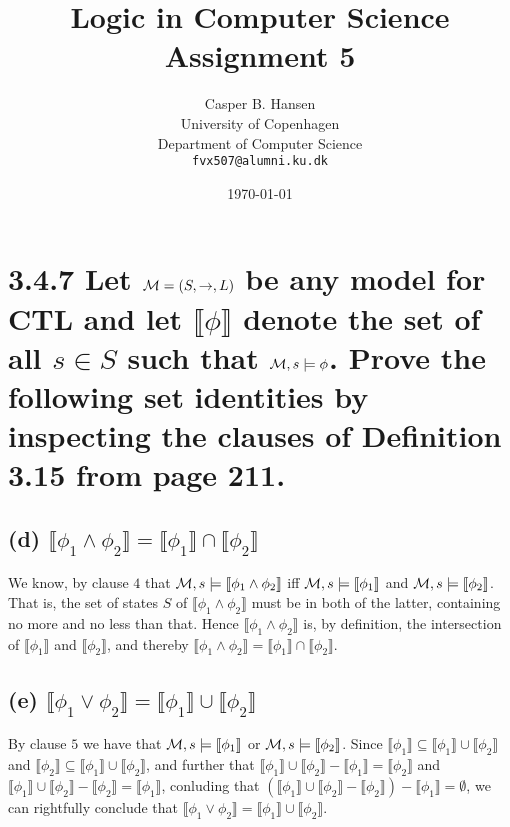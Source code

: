 \documentclass[11pt,a4paper]{article}
\title
{
{\Large Logic in Computer Science}\\
Assignment 5
}
\author
{
	Casper B. Hansen\\
	University of Copenhagen\\
	Department of Computer Science\\
	{\tt fvx507@alumni.ku.dk}
}
\date{\today}
\let\imp\to
\begin{document}
\maketitle

\section*{3.4.7 \mdseries Let ${\cal M} = (S,\imp,L)$ be any model for CTL and
let $\llbracket\phi\rrbracket$ denote the set of all $s \in S$ such that
${\cal M}, s \models \phi$. Prove the following set identities by inspecting
the clauses of Definition 3.15 from page 211.}

\subsection*{(d) \mdseries $\llbracket\phi_1 \land \phi_2\rrbracket =
\llbracket\phi_1\rrbracket\cap\llbracket\phi_2\rrbracket$}
We know, by clause $4$ that ${\cal M}, s \models \llbracket\phi_1 \land
\phi_2\rrbracket$ iff ${\cal M}, s \models \llbracket\phi_1\rrbracket$ and
${\cal M}, s \models \llbracket\phi_2\rrbracket$. That is, the set of states
$S$ of $\llbracket\phi_1 \land \phi_2\rrbracket$ must be in both of the
latter, containing no more and no less than that. Hence $\llbracket\phi_1
\land \phi_2\rrbracket$ is, by definition, the intersection of
$\llbracket\phi_1\rrbracket$ and $\llbracket\phi_2\rrbracket$, and thereby
$\llbracket\phi_1 \land \phi_2\rrbracket =
\llbracket\phi_1\rrbracket\cap\llbracket\phi_2\rrbracket$.

\subsection*{(e) \mdseries $\llbracket\phi_1 \lor \phi_2\rrbracket =
\llbracket\phi_1\rrbracket\cup\llbracket\phi_2\rrbracket$}
By clause $5$ we have that ${\cal M}, s \models \llbracket\phi_1\rrbracket$ or
${\cal M}, s \models \llbracket\phi_2\rrbracket$. Since
$\llbracket\phi_1\rrbracket \subseteq
\llbracket\phi_1\rrbracket\cup\llbracket\phi_2\rrbracket$ and
$\llbracket\phi_2\rrbracket \subseteq
\llbracket\phi_1\rrbracket\cup\llbracket\phi_2\rrbracket$, and further that
$\llbracket\phi_1\rrbracket\cup\llbracket\phi_2\rrbracket -
\llbracket\phi_1\rrbracket = \llbracket\phi_2\rrbracket$ and
$\llbracket\phi_1\rrbracket\cup\llbracket\phi_2\rrbracket -
\llbracket\phi_2\rrbracket = \llbracket\phi_1\rrbracket$, conluding that
$(\llbracket\phi_1\rrbracket\cup\llbracket\phi_2\rrbracket -
\llbracket\phi_2\rrbracket) - \llbracket\phi_1\rrbracket = \emptyset$, we can
rightfully conclude that $\llbracket\phi_1 \lor \phi_2\rrbracket =
\llbracket\phi_1\rrbracket\cup\llbracket\phi_2\rrbracket$.
\end{document}
